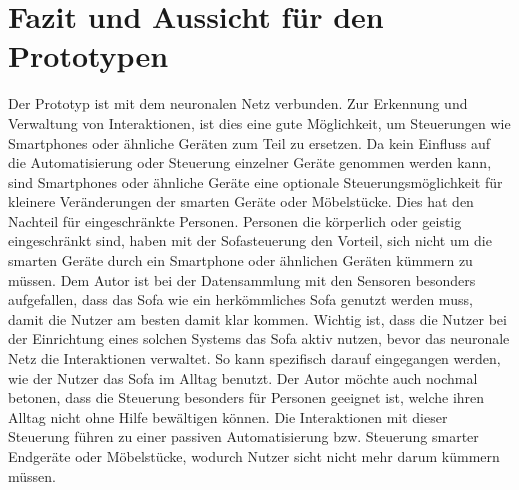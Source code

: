 \chapter{Fazit und Aussicht für den Prototypen}
Der Prototyp ist mit dem neuronalen Netz verbunden. Zur Erkennung und Verwaltung von Interaktionen, ist dies eine gute Möglichkeit, um Steuerungen wie Smartphones oder ähnliche Geräten zum Teil zu ersetzen. Da kein Einfluss auf die Automatisierung oder Steuerung einzelner Geräte genommen werden kann, sind Smartphones oder ähnliche Geräte eine optionale Steuerungsmöglichkeit für kleinere Veränderungen der smarten Geräte oder Möbelstücke. Dies hat den Nachteil für eingeschränkte Personen. Personen die körperlich oder geistig eingeschränkt sind, haben mit der Sofasteuerung den Vorteil, sich nicht um die smarten Geräte durch ein Smartphone oder ähnlichen Geräten kümmern zu müssen.
\newline
Dem Autor ist bei der Datensammlung mit den Sensoren besonders aufgefallen, dass das Sofa wie ein herkömmliches Sofa genutzt werden muss, damit die Nutzer am besten damit klar kommen. Wichtig ist, dass die Nutzer bei der Einrichtung eines solchen Systems das Sofa aktiv nutzen, bevor das neuronale Netz die Interaktionen verwaltet. So kann spezifisch darauf eingegangen werden, wie der Nutzer das Sofa im Alltag benutzt.
\newline
\newline
Der Autor möchte auch nochmal betonen, dass die Steuerung besonders für Personen geeignet ist, welche ihren Alltag nicht ohne Hilfe bewältigen können. Die Interaktionen mit dieser Steuerung führen zu einer passiven Automatisierung bzw. Steuerung smarter Endgeräte oder Möbelstücke, wodurch Nutzer sicht nicht mehr darum kümmern müssen.

